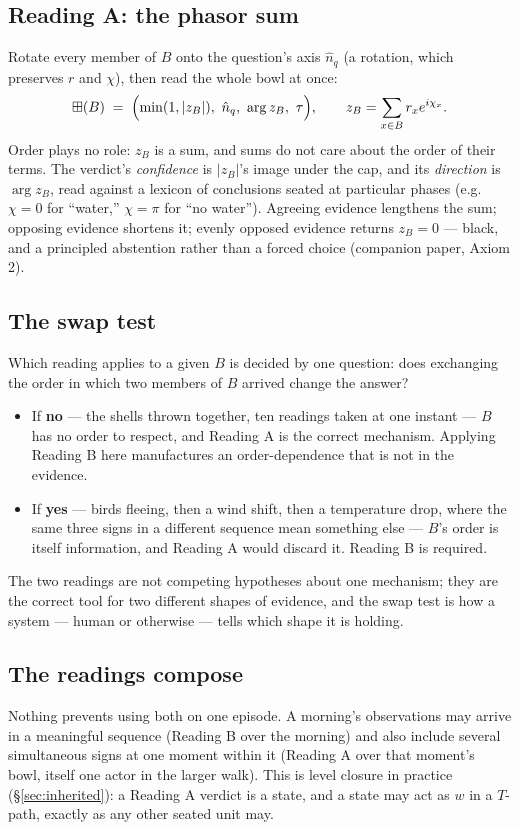 \documentclass[12pt, a4paper]{article}
\begin{document}
\subsection{Reading A: the phasor sum}
\label{subsec:reading_a}
Rotate every member of $B$ onto the question's axis $\hat n_q$ (a
rotation, which preserves $r$ and $\chi$), then read the whole bowl at
once:
\[
    \boxplus(B) \;=\; \Bigl(\min(1,|z_B|),\ \hat n_q,\ \arg z_B,\ \tau\Bigr),
    \qquad
    z_B=\sum_{x\in B} r_x e^{i\chi_x}.
\]
Order plays no role: $z_B$ is a sum, and sums do not care about the
order of their terms. The verdict's \emph{confidence} is $|z_B|$'s
image under the cap, and its \emph{direction} is $\arg z_B$, read
against a lexicon of conclusions seated at particular phases (e.g.\
$\chi=0$ for ``water,'' $\chi=\pi$ for ``no water''). Agreeing evidence
lengthens the sum; opposing evidence shortens it; evenly opposed
evidence returns $z_B=0$ --- black, and a principled abstention rather
than a forced choice (companion paper, Axiom 2).

\subsection{The swap test}
\label{subsec:swap_test}
Which reading applies to a given $B$ is decided by one question: does
exchanging the order in which two members of $B$ arrived change the
answer?
\begin{itemize}
\item If \textbf{no} --- the shells thrown together, ten readings
      taken at one instant --- $B$ has no order to respect, and
      Reading A is the correct mechanism. Applying Reading B here
      manufactures an order-dependence that is not in the evidence.
\item If \textbf{yes} --- birds fleeing, then a wind shift, then a
      temperature drop, where the same three signs in a different
      sequence mean something else --- $B$'s order is itself
      information, and Reading A would discard it. Reading B is
      required.
\end{itemize}
The two readings are not competing hypotheses about one mechanism;
they are the correct tool for two different shapes of evidence, and
the swap test is how a system --- human or otherwise --- tells which
shape it is holding.

\subsection{The readings compose}
\label{subsec:readings_compose}
Nothing prevents using both on one episode. A morning's observations
may arrive in a meaningful sequence (Reading B over the morning) and
also include several simultaneous signs at one moment within it
(Reading A over that moment's bowl, itself one actor in the larger
walk). This is level closure in practice (\S\ref{sec:inherited}): a
Reading A verdict is a state, and a state may act as $w$ in a $T$-path,
exactly as any other seated unit may.
\end{document}
